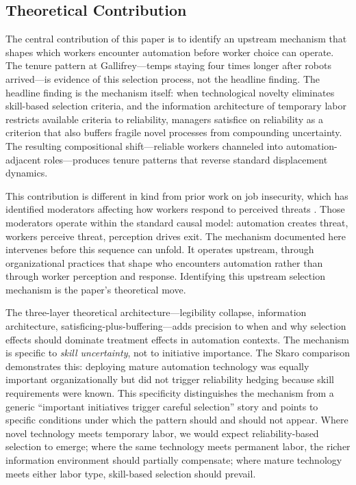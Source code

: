 \documentclass[12pt]{article}
\begin{document}
\subsection{Theoretical Contribution}

The central contribution of this paper is to identify an upstream mechanism that shapes which workers encounter automation before worker choice can operate. The tenure pattern at Gallifrey---temps staying four times longer after robots arrived---is evidence of this selection process, not the headline finding. The headline finding is the mechanism itself: when technological novelty eliminates skill-based selection criteria, and the information architecture of temporary labor restricts available criteria to reliability, managers satisfice on reliability as a criterion that also buffers fragile novel processes from compounding uncertainty. The resulting compositional shift---reliable workers channeled into automation-adjacent roles---produces tenure patterns that reverse standard displacement dynamics.

This contribution is different in kind from prior work on job insecurity, which has identified moderators affecting how workers respond to perceived threats \citep{brockner1994interactive, ashford1989content}. Those moderators operate within the standard causal model: automation creates threat, workers perceive threat, perception drives exit. The mechanism documented here intervenes before this sequence can unfold. It operates upstream, through organizational practices that shape who encounters automation rather than through worker perception and response. Identifying this upstream selection mechanism is the paper's theoretical move.

The three-layer theoretical architecture---legibility collapse, information architecture, satisficing-plus-buffering---adds precision to when and why selection effects should dominate treatment effects in automation contexts. The mechanism is specific to \textit{skill uncertainty}, not to initiative importance. The Skaro comparison demonstrates this: deploying mature automation technology was equally important organizationally but did not trigger reliability hedging because skill requirements were known. This specificity distinguishes the mechanism from a generic ``important initiatives trigger careful selection'' story and points to specific conditions under which the pattern should and should not appear. Where novel technology meets temporary labor, we would expect reliability-based selection to emerge; where the same technology meets permanent labor, the richer information environment should partially compensate; where mature technology meets either labor type, skill-based selection should prevail.
\end{document}
